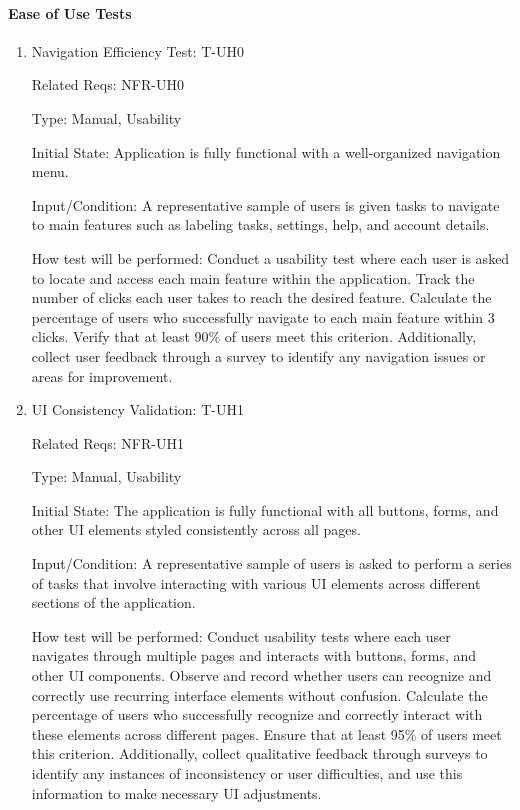 \documentclass[12pt, titlepage]{article}
\begin{document}
\paragraph{Ease of Use Tests}
\begin{enumerate}

\item{Navigation Efficiency Test: T-UH0\\}

Related Reqs: NFR-UH0

Type: Manual, Usability

Initial State: Application is fully functional with a well-organized navigation menu.

Input/Condition: A representative sample of users is given tasks to navigate to main features such as labeling tasks, settings, help, and account details.

How test will be performed: Conduct a usability test where each user is asked to locate and access each main feature within the application. Track the number of clicks each user takes to reach the desired feature. Calculate the percentage of users who successfully navigate to each main feature within 3 clicks. Verify that at least 90\% of users meet this criterion. Additionally, collect user feedback through a survey to identify any navigation issues or areas for improvement.

\item{UI Consistency Validation: T-UH1\\}

Related Reqs: NFR-UH1

Type: Manual, Usability

Initial State: The application is fully functional with all buttons, forms, and other UI elements styled consistently across all pages.

Input/Condition: A representative sample of users is asked to perform a series of tasks that involve interacting with various UI elements across different sections of the application.

How test will be performed: Conduct usability tests where each user navigates through multiple pages and interacts with buttons, forms, and other UI components. Observe and record whether users can recognize and correctly use recurring interface elements without confusion. Calculate the percentage of users who successfully recognize and correctly interact with these elements across different pages. Ensure that at least 95\% of users meet this criterion. Additionally, collect qualitative feedback through surveys to identify any instances of inconsistency or user difficulties, and use this information to make necessary UI adjustments.

\end{enumerate}
\end{document}
